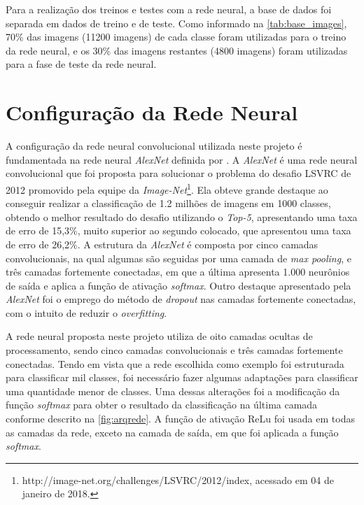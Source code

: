 \par Para a realização dos treinos e testes com a rede neural, a base de dados foi separada em dados de treino e de teste. Como informado na \autoref{tab:base_images}, 70\% das imagens (11200 imagens) de cada classe foram utilizadas para o treino da rede neural, e os 30\% das imagens restantes (4800 imagens) foram utilizadas para a fase de teste da rede neural.




\section{Configuração da Rede Neural}

A configuração da rede neural convolucional utilizada neste projeto é fundamentada na rede neural \textit{AlexNet} definida por . A \textit{AlexNet} é uma rede neural convolucional que foi proposta para solucionar o problema do desafio LSVRC de 2012 promovido pela equipe da \textit{Image-Net}\footnote{http://image-net.org/challenges/LSVRC/2012/index, acessado em 04 de janeiro de 2018.}. Ela obteve grande destaque ao conseguir realizar a classificação de 1.2 milhões de imagens em 1000 classes, obtendo o melhor resultado do desafio utilizando o \textit{Top-5}, apresentando uma taxa de erro de 15,3\%, muito superior ao segundo colocado, que apresentou uma taxa de erro de 26,2\%. A estrutura da \textit{AlexNet} é composta por cinco camadas convolucionais, na qual algumas são seguidas por uma camada de \textit{max pooling}, e três camadas fortemente conectadas, em que a última apresenta 1.000 neurônios de saída e aplica a função de ativação \textit{softmax}. Outro destaque apresentado pela \textit{AlexNet} foi o emprego do método de \textit{dropout} nas camadas fortemente conectadas, com o intuito de reduzir o \textit{overfitting}.

\par A rede neural proposta neste projeto utiliza de oito camadas ocultas de processamento, sendo cinco camadas convolucionais e três camadas fortemente conectadas. Tendo em vista que a rede escolhida como exemplo foi estruturada para classificar mil classes, foi necessário fazer algumas adaptações para classificar uma quantidade menor de classes. Uma dessas alterações foi a modificação da função \textit{softmax} para obter o resultado da classificação na última camada conforme descrito na \autoref{fig:arqrede}. A função de ativação ReLu foi usada em todas as camadas da rede, exceto na camada de saída, em que foi aplicada a função \textit{softmax}.

